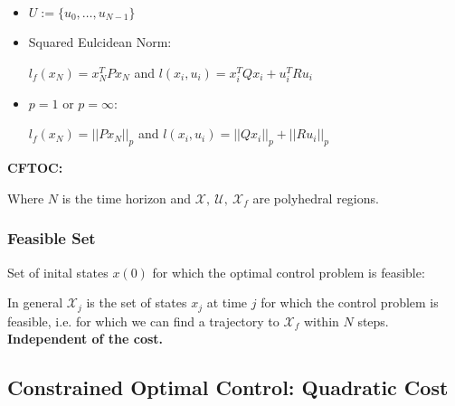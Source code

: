 \documentclass[8pt,a4paper]{scrartcl}
\begin{document}
\begin{multicols*}{3}
\begin{multicols*}{4}
{

\begin{itemize}

\item $U:=\{u_0,\ldots,u_{N-1}\}$
\item Squared Eulcidean Norm:

$l_f(x_N)=x_N^TPx_N$ and $l(x_i,u_i)=x_i^TQx_i+u_i^TRu_i$
\item $p=1$ or $p=\infty$: 

$l_f(x_N)=||Px_N||_p$ and $l(x_i,u_i)=||Qx_i||_p+||Ru_i||_p$
\end{itemize}

\textbf{CFTOC:}


Where $N$ is the time horizon and $\mathcal{X},\ \mathcal{U},\ \mathcal{X}_f$ are polyhedral regions.

\subsubsection{Feasible Set}

Set of inital states $x(0)$ for which the optimal control problem is feasible:


In general $\mathcal{X}_j$ is the set of states $x_j$ at time $j$ for which the control problem is feasible, i.e. for which we can find a trajectory to $\mathcal{X}_f$ within $N$ steps. \textbf{Independent of the cost.}
}%

\subsection{Constrained Optimal Control: Quadratic Cost}



\end{multicols*}
\end{multicols*}
\end{document}
